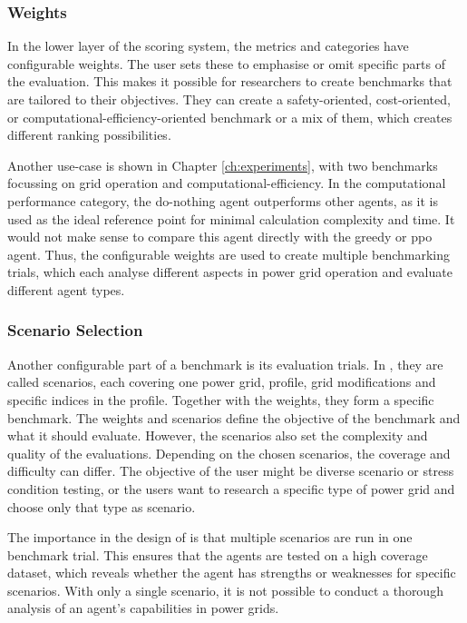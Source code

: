 \subsubsection{Weights}
In the lower layer of the scoring system, the metrics and categories have configurable weights. The user sets these to emphasise or omit specific parts of the evaluation. This makes it possible for researchers to create benchmarks that are tailored to their objectives. They can create a safety-oriented, cost-oriented, or computational-efficiency-oriented benchmark or a mix of them, which creates different ranking possibilities. 

Another use-case is shown in Chapter \ref{ch:experiments}, with two benchmarks focussing on grid operation and computational-efficiency. In the computational performance category, the do-nothing agent outperforms other agents, as it is used as the ideal reference point for minimal calculation complexity and time. It would not make sense to compare this agent directly with the greedy or \ac{ppo} agent. Thus, the configurable weights are used to create multiple benchmarking trials, which each analyse different aspects in power grid operation and evaluate different agent types.

\subsubsection{Scenario Selection} 
Another configurable part of a benchmark is its evaluation trials. In \benchmark, they are called scenarios, each covering one power grid, profile, grid modifications and specific indices in the profile. Together with the weights, they form a specific benchmark. The weights and scenarios define the objective of the benchmark and what it should evaluate. However, the scenarios also set the complexity and quality of the evaluations. Depending on the chosen scenarios, the coverage and difficulty can differ. The objective of the user might be diverse scenario or stress condition testing, or the users want to research a specific type of power grid and choose only that type as scenario. 

The importance in the design of \benchmark is that multiple scenarios are run in one benchmark trial. This ensures that the agents are tested on a high coverage dataset, which reveals whether the agent has strengths or weaknesses for specific scenarios. With only a single scenario, it is not possible to conduct a thorough analysis of an agent's capabilities in power grids.

